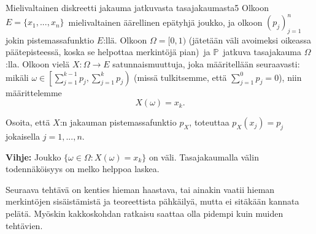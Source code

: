 \documentclass[11pt,a4paper]{amsart}
\newcommand{\Z}{\mathbb{Z}}
\newcommand{\1}{\mathbf{1}}
\renewcommand{\P}{\mathbb P}
\begin{document}
\begin{Exercises}{Mielivaltainen diskreetti jakauma jatkuvasta tasajakaumasta}{5}
Olkoon $E=\{x_1,...,x_n\}$ mielivaltainen äärellinen epätyhjä joukko, ja olkoon $(p_j)_{j=1}^n$ jokin pistemassafunktio $E$:llä. Olkoon $\Omega=[0,1)$ (jätetään väli avoimeksi oikeassa päätepisteessä, koska se helpottaa merkintöjä pian) ja $\P$ jatkuva tasajakauma $\Omega$:lla. Olkoon vielä $X:\Omega\to E$ satunnaismuuttuja, joka määritellään seuraavasti: mikäli $\omega\in \left[\sum_{j=1}^{k-1}p_j, \sum_{j=1}^k p_j \right)$ (missä tulkitsemme, että $\sum_{j=1}^0p_j=0$), niin määrittelemme
\[
X(\omega)=x_k.
\] 

Osoita, että $X$:n jakauman pistemassafunktio $p_X$, toteuttaa $p_X(x_j)=p_j$ jokaisella $j=1,...,n$.

\medskip

{\bf Vihje: } Joukko $\{\omega\in \Omega: X(\omega)=x_k\}$ on väli. Tasajakaumalla välin todennäköisyys on melko helppoa laskea.

\end{Exercises}

Seuraava tehtävä on kenties hieman haastava, tai ainakin vaatii hieman merkintöjen sisäistämistä ja teoreettista pähkäilyä, mutta ei sitäkään kannata pelätä. Myöskin kakkoskohdan ratkaisu saattaa olla pidempi kuin muiden tehtävien. 
\end{document}
